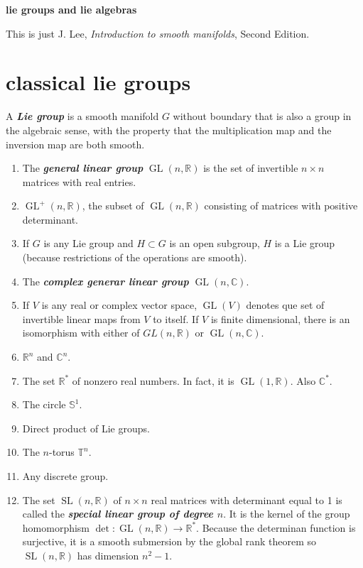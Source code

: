 \documentclass{article}
\makeatletter
\renewcommand\tableofcontents{%
	\@starttoc{toc}%
}
\numberwithin{equation}{section}
\newcommand{\R}{\mathbb{R}}
\newcommand{\C}{\mathbb{C}}
\newcommand{\T}{\mathbb{T}}
\renewcommand{\S}{\mathbb{S}}
\renewcommand{\T}{\mathbb{T}}
\DeclareMathOperator{\GL}{GL}
\DeclareMathOperator{\SL}{SL}
\makeatother
\begin{document}
{\LARGE\bfseries lie groups and lie algebras}
\thispagestyle{fancy}
\vspace{.5cm}

This is just J. Lee, \textit{Introduction to smooth manifolds}, Second Edition.

\tableofcontents
\section{classical lie groups}
\begin{defn}
	A \textbf{\textit{Lie group}} is a smooth manifold $G$ without boundary that is also a group in the algebraic sense, with the property that the multiplication map and the inversion map are both smooth.
\end{defn}
\begin{example}\leavevmode
	\begin{enumerate}
		\item The \textbf{\textit{general linear group}} $\GL(n,\R)$ is the set of invertible $n\times n$ matrices with real entries.
		\item $\GL^+(n,\R)$, the subset of $\GL(n,\R)$ consisting of matrices with positive determinant.
		\item If $G$ is any Lie group and $H\subset G$ is an open subgroup, $H$ is a Lie group (because restrictions of the operations are smooth).
		\item The \textbf{\textit{complex generar linear group}} $\GL(n,\C)$.
		\item If $V$ is any real or complex vector space, $\GL(V)$ denotes que set of invertible linear maps from $V$ to itself. If $V$ is finite dimensional, there is an isomorphism with either of $GL(n,\R)$ or $\GL(n,\C)$.
		\item $\R^n$ and $\C^n$.
		\item The set $\R^*$ of nonzero real numbers. In fact, it is $\GL(1,\R)$. Also $\C^*$.
		\item The circle $\S^1$.
		\item Direct product of Lie groups.
		\item The $n$-torus $\T^n$.
		\item Any discrete group.
		\item The set $\SL(n,\R)$ of $n\times n$ real matrices with determinant equal to 1 is called the \textbf{\textit{special linear group of degree $n$}}. It is the kernel of the group homomorphism $\det:\GL(n,\R)\to\R^*$. Because the determinan function is surjective, it is a smooth submersion by the global rank theorem so $\SL(n,\R)$ has dimension $n^2-1$.

\end{enumerate}
\end{example}
\end{document}
